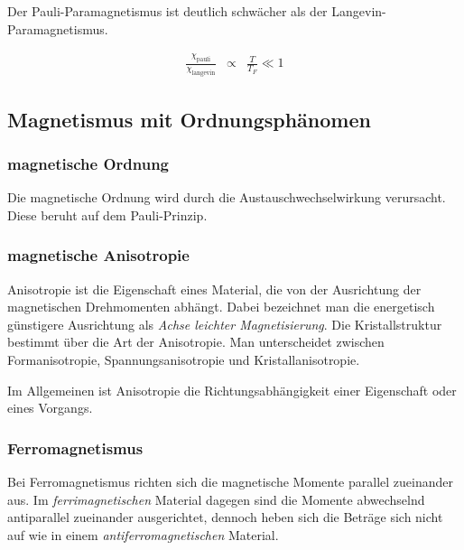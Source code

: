 \documentclass[12pt,a4paper]{scrartcl}
\numberwithin{equation}{section} %
\renewcommand{\[}{} %
\renewcommand{\]}{\noindent} %
\begin{document}
Der Pauli-Paramagnetismus ist deutlich schwächer als der
Langevin-Paramagnetismus.

\[
\begin{eqnarray}
    \frac{\chi_\mathrm{pauli}}{\chi_\mathrm{langevin}}
        &\propto& \frac{T}{T_F} \ll 1
\end{eqnarray}
\]

\hypertarget{magnetismus-mit-ordnungsphuxe4nomen}{%
\subsection{Magnetismus mit
Ordnungsphänomen}\label{magnetismus-mit-ordnungsphuxe4nomen}}

\hypertarget{magnetische-ordnung}{%
\subsubsection{magnetische Ordnung}\label{magnetische-ordnung}}

Die magnetische Ordnung wird durch die Austauschwechselwirkung
verursacht. Diese beruht auf dem Pauli-Prinzip.

\hypertarget{magnetische-anisotropie}{%
\subsubsection{magnetische Anisotropie}\label{magnetische-anisotropie}}

Anisotropie ist die Eigenschaft eines Material, die von der Ausrichtung
der magnetischen Drehmomenten abhängt. Dabei bezeichnet man die
energetisch günstigere Ausrichtung als \emph{Achse leichter
Magnetisierung}. Die Kristallstruktur bestimmt über die Art der
Anisotropie. Man unterscheidet zwischen Formanisotropie,
Spannungsanisotropie und Kristallanisotropie.

Im Allgemeinen ist Anisotropie die Richtungsabhängigkeit einer
Eigenschaft oder eines Vorgangs.

\hypertarget{ferromagnetismus}{%
\subsubsection{Ferromagnetismus}\label{ferromagnetismus}}

Bei Ferromagnetismus richten sich die magnetische Momente parallel
zueinander aus. Im \emph{ferrimagnetischen} Material dagegen sind die
Momente abwechselnd antiparallel zueinander ausgerichtet, dennoch heben
sich die Beträge sich nicht auf wie in einem
\emph{antiferromagnetischen} Material.
\end{document}

